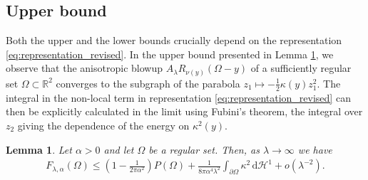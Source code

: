 \documentclass[11pt]{article}
\newcounter{statement}
\numberwithin{statement}{section}
\numberwithin{equation}{section}
\newtheorem{lemma}[statement]{Lemma}
\theoremstyle{remark}
\newcommand{\R}{\mathbb R} 				%
\newcommand{\intd}{\, \mathrm{d}} 				%
\newcommand{\Hd}{\mathcal H}				%
\begin{document}
\subsection{Upper bound}

Both the upper and the lower bounds crucially depend on the
representation \eqref{eq:representation_revised}.  In the upper bound
presented in Lemma \ref{lem:expansion}, we observe that the
anisotropic blowup $A_\lambda R_{\nu(y)} (\Omega - y)$ of a
sufficiently regular set $\Omega \subset \R^2$ converges to the
subgraph of the parabola
$z_1 \mapsto -\frac{1}{2} \kappa(y) z_1^2$.  The integral in
the non-local term in representation
\eqref{eq:representation_revised} can then be explicitly calculated in
the limit using Fubini's theorem, the integral over $z_2$ giving
the dependence of the energy on $\kappa^2(y)$.

\begin{lemma}\label{lem:expansion}
  Let $\alpha > 0$ and let $\Omega$ be a regular set. Then, as
  $\lambda \to \infty$ we have
	\begin{align*}
          F_{\lambda,\alpha}(\Omega) \leq \left( 1- \frac{1}{2\pi
          \alpha^2}\right) P(\Omega) + \frac{1}{8\pi \alpha^4
          \lambda^2}   \int_{\partial \Omega} \kappa^2 \intd \Hd^1 + 
          o\left(\lambda^{-2} \right).
	\end{align*}
   \end{lemma}
\end{document}
